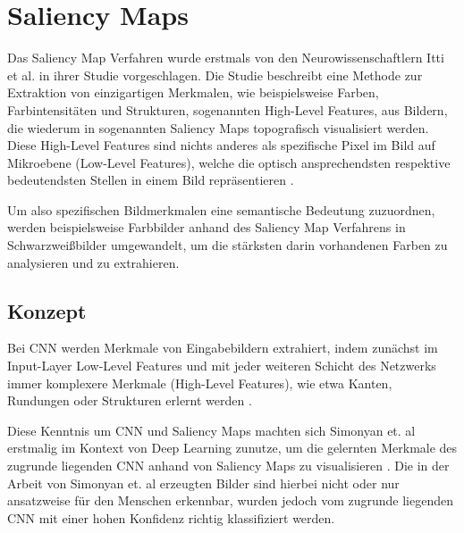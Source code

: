 \chapter{Saliency Maps}
\label{cha:saliency}
Das Saliency Map Verfahren wurde erstmals von den Neurowissenschaftlern Itti et al. \cite{itti_model_1998} in ihrer Studie vorgeschlagen. Die Studie beschreibt eine Methode zur Extraktion von einzigartigen Merkmalen, wie beispielsweise Farben, Farbintensitäten und Strukturen, sogenannten High-Level Features, aus Bildern, die wiederum in sogenannten Saliency Maps topografisch visualisiert werden. Diese High-Level Features sind nichts anderes als spezifische Pixel im Bild auf Mikroebene (Low-Level Features), welche die optisch ansprechendsten respektive bedeutendsten Stellen in einem Bild repräsentieren \cite{itti_model_1998}. 

Um also spezifischen Bildmerkmalen eine semantische Bedeutung zuzuordnen, werden beispielsweise Farbbilder anhand des Saliency Map Verfahrens in Schwarzweißbilder umgewandelt, um die stärksten darin vorhandenen Farben zu analysieren und zu extrahieren.

\section{Konzept}
\label{cha:saliency_konz}
Bei \ac{CNN} werden Merkmale von Eingabebildern extrahiert, indem zunächst im Input-Layer Low-Level Features und mit jeder weiteren Schicht des Netzwerks immer komplexere Merkmale (High-Level Features), wie etwa Kanten, Rundungen oder Strukturen erlernt werden \cite{stanford_unsupervised_tutorial}.

Diese Kenntnis um \ac{CNN} und Saliency Maps machten sich Simonyan et. al erstmalig im Kontext von Deep Learning zunutze, um die gelernten Merkmale des zugrunde liegenden \ac{CNN} anhand von Saliency Maps zu visualisieren \cite{simonyan_deep_2013}. 
Die in der Arbeit von Simonyan et. al erzeugten Bilder sind hierbei nicht oder nur ansatzweise für den Menschen erkennbar, wurden jedoch vom zugrunde liegenden \ac{CNN} mit einer hohen Konfidenz richtig klassifiziert werden.
~\newline

